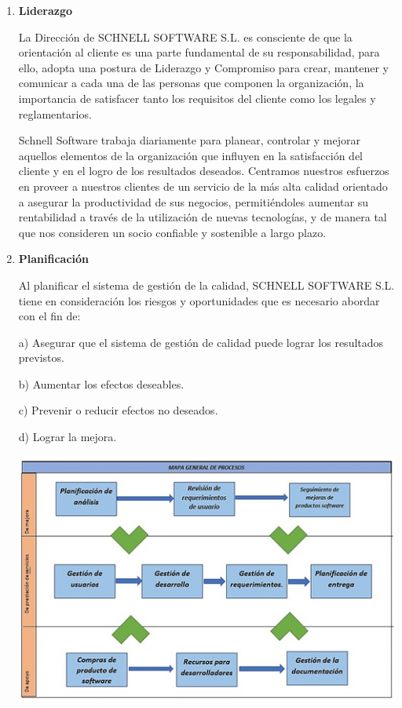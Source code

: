 \documentclass[10pt,a4paper]{article}
\begin{document}
\begin{enumerate}
\item \textbf{Liderazgo}

La Dirección de SCHNELL SOFTWARE S.L. es consciente de que la orientación al cliente es una parte fundamental de su responsabilidad, para ello, adopta una postura de Liderazgo y Compromiso para crear, mantener y comunicar a cada una de las personas que componen la organización, la importancia de satisfacer tanto los requisitos del cliente como los legales y reglamentarios.

Schnell Software trabaja diariamente para planear, controlar y mejorar aquellos elementos de la organización que influyen en la satisfacción del cliente y en el logro de los resultados deseados. Centramos nuestros esfuerzos en proveer a nuestros clientes de un servicio de la más alta calidad orientado a asegurar la productividad de sus negocios, permitiéndoles aumentar su rentabilidad a través de la utilización de nuevas tecnologías, y de manera tal que nos consideren un socio confiable y sostenible a largo plazo.

\item \textbf{Planificación}

Al planificar el sistema de gestión de la calidad, SCHNELL SOFTWARE S.L. tiene en consideración los riesgos y oportunidades que es necesario abordar con el fin de:

a) Asegurar que el sistema de gestión de calidad puede lograr los resultados previstos.

b) Aumentar los efectos deseables.

c) Prevenir o reducir efectos no deseados.

d) Lograr la mejora.

\includegraphics[scale=1]{Mapa de procesos.jpeg} 


\end{enumerate}
\end{document}
